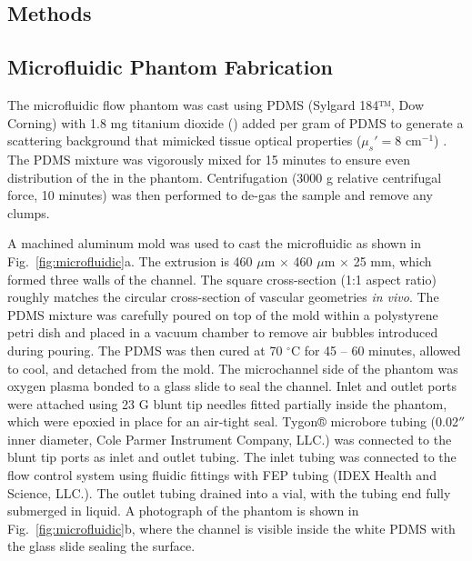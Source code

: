 \documentclass[12pt]{spieman}
\begin{document}
\begin{spacing}{2}
\section{Methods}
\label{sect:methods}

\subsection{Microfluidic Phantom Fabrication}
\label{sect:methods_phantom}
The microfluidic flow phantom was cast using PDMS (Sylgard 184™, Dow Corning) with 1.8 mg titanium dioxide () added per gram of PDMS to generate a scattering background that mimicked tissue optical properties ($\mu_s' = 8$ cm$^{-1}$) \cite{Parthasarathy:2008el,Yaroslavsky:2002tg}. The PDMS  mixture was vigorously mixed for 15 minutes to ensure even distribution of the  in the phantom. Centrifugation (3000 g relative centrifugal force, 10 minutes) was then performed to de-gas the sample and remove any  clumps.

A machined aluminum mold was used to cast the microfluidic as shown in Fig.~\ref{fig:microfluidic}a. The extrusion is 460 $\mu$m $\times$ 460 $\mu$m $\times$ 25 mm, which formed three walls of the channel. The square cross-section (1:1 aspect ratio) roughly matches the circular cross-section of vascular geometries \textit{in vivo}. The PDMS  mixture was carefully poured on top of the mold within a polystyrene petri dish and placed in a vacuum chamber to remove air bubbles introduced during pouring. The PDMS was then cured at 70 $^\circ$C for 45 -- 60 minutes, allowed to cool, and detached from the mold. The microchannel side of the phantom was oxygen plasma bonded to a glass slide to seal the channel. Inlet and outlet ports were attached using 23 G blunt tip needles fitted partially inside the phantom, which were epoxied in place for an air-tight seal. Tygon® microbore tubing (0.02$''$ inner diameter, Cole Parmer Instrument Company, LLC.) was connected to the blunt tip ports as inlet and outlet tubing. The inlet tubing was connected to the flow control system using fluidic fittings with FEP tubing (IDEX Health and Science, LLC.). The outlet tubing drained into a vial, with the tubing end fully submerged in liquid. A photograph of the phantom is shown in Fig.~\ref{fig:microfluidic}b, where the channel is visible inside the white PDMS with the glass slide sealing the surface.


\end{spacing}
\end{document}
